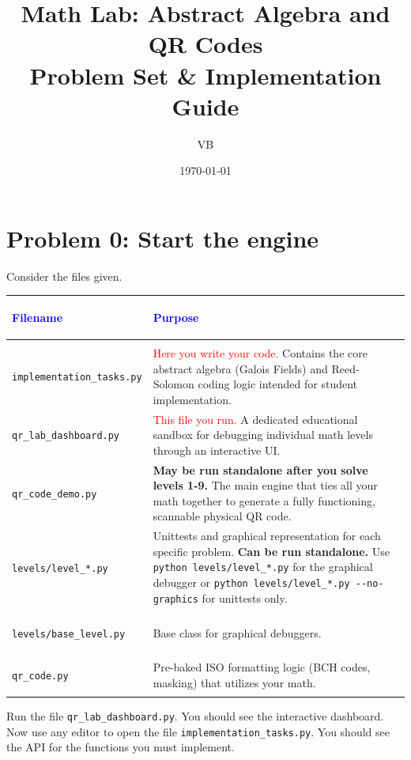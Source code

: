 \documentclass[11pt]{article}
\title{Math Lab: Abstract Algebra and QR Codes \\ \large Problem Set \& Implementation Guide}
\author{VB}
\date{\today}
\begin{document}
\maketitle

\section*{Problem 0: Start the engine}

Consider the files given.
\begin{center}
\renewcommand{\arraystretch}{1.5}
\begin{tabularx}{\textwidth}{@{} >{\bfseries\raggedright\arraybackslash}p{5.5cm} X @{}}
\toprule
\textcolor{blue}{Filename} & \textcolor{blue}{Purpose} \\ \midrule
\multicolumn{2}{@{}l}{\textbf{Direct Interaction}} \\ \midrule
\lstinline|implementation_tasks.py| & \textcolor{red}{Here you write your code.} Contains the core abstract algebra (Galois Fields) and Reed-Solomon coding logic intended for student implementation. \\
\lstinline|qr_lab_dashboard.py| & \textcolor{red}{This file you run.} A dedicated educational sandbox for debugging individual math levels through an interactive UI. \\
\lstinline|qr_code_demo.py| & \textbf{May be run standalone after you solve levels 1-9.} The main engine that ties all your math together to generate a fully functioning, scannable physical QR code. \\
\lstinline|levels/level_*.py| & Unittests and graphical representation for each specific problem. \textbf{Can be run standalone.} Use \lstinline|python levels/level_*.py| for the graphical debugger or \lstinline|python levels/level_*.py --no-graphics| for unittests only. \\ \midrule
\multicolumn{2}{@{}l}{\textbf{Under the Hood}} \\ \midrule
\lstinline|levels/base_level.py| & Base class for graphical debuggers. \\
\lstinline|qr_code.py| & Pre-baked ISO formatting logic (BCH codes, masking) that utilizes your math. \\
\bottomrule
\end{tabularx}
\end{center}

Run the file \lstinline|qr_lab_dashboard.py|. You should see the interactive dashboard.
Now use any editor to open the file \lstinline|implementation_tasks.py|. You should see the API for the functions you must implement.
\end{document}
